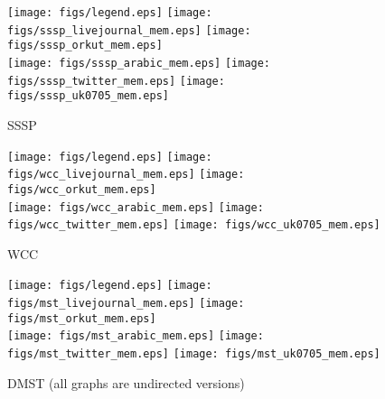 \documentclass{article}
\newcommand{\bline}[1][1]{\vspace{#1\baselineskip}}
\begin{document}
\begin{figure}[!h]
  \bline[3.5]
  \centering
  \texttt{[image: figs/legend.eps]}\hspace{3em}%
  \texttt{[image: figs/sssp\_livejournal\_mem.eps]}\hspace{1em}%
  \texttt{[image: figs/sssp\_orkut\_mem.eps]}\\
  \texttt{[image: figs/sssp\_arabic\_mem.eps]}\hspace{1em}%
  \texttt{[image: figs/sssp\_twitter\_mem.eps]}\hspace{1em}%
  \texttt{[image: figs/sssp\_uk0705\_mem.eps]}
  \caption{SSSP}
\end{figure}

\begin{figure}[!h]
  \bline[3.5]
  \centering
  \texttt{[image: figs/legend.eps]}\hspace{3em}%
  \texttt{[image: figs/wcc\_livejournal\_mem.eps]}\hspace{1em}%
  \texttt{[image: figs/wcc\_orkut\_mem.eps]}\\
  \texttt{[image: figs/wcc\_arabic\_mem.eps]}\hspace{1em}%
  \texttt{[image: figs/wcc\_twitter\_mem.eps]}\hspace{1em}%
  \texttt{[image: figs/wcc\_uk0705\_mem.eps]}
  \caption{WCC}
\end{figure}

\begin{figure}[!h]
  \bline[3.5]
  \centering
  \texttt{[image: figs/legend.eps]}\hspace{3em}%
  \texttt{[image: figs/mst\_livejournal\_mem.eps]}\hspace{1em}%
  \texttt{[image: figs/mst\_orkut\_mem.eps]}\\
  \texttt{[image: figs/mst\_arabic\_mem.eps]}\hspace{1em}%
  \texttt{[image: figs/mst\_twitter\_mem.eps]}\hspace{1em}%
  \texttt{[image: figs/mst\_uk0705\_mem.eps]}
  \caption{DMST (all graphs are undirected versions)}
\end{figure}
\end{document}
